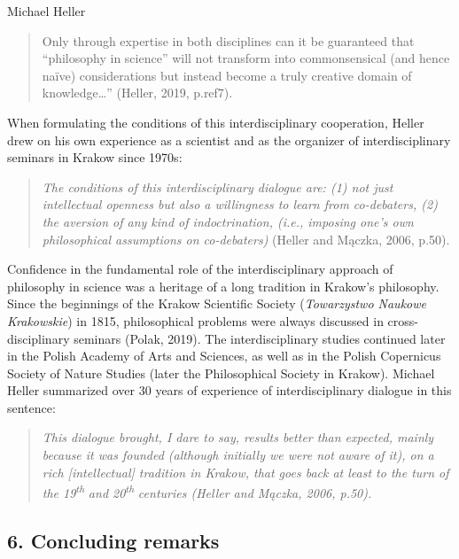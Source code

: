 \begin{artengenv}{Michael Heller}
\begin{quotation}
Only through expertise in both disciplines can it be guaranteed that “philosophy in science” will not transform into
commonsensical (and hence naïve) considerations but instead become a truly creative domain of knowledge…” (Heller,
2019, p.ref7).

\end{quotation}
When formulating the conditions of this interdisciplinary cooperation, Heller drew on his own experience as a scientist
and as the organizer of interdisciplinary seminars in Krakow since 1970s:

\begin{quotation}
\textit{The conditions of this interdisciplinary dialogue are: (1) not just intellectual openness but also a willingness
to learn from co-debaters, (2) the aversion of any kind of indoctrination, (i.e., imposing one’s own philosophical
assumptions on co-debaters)} (Heller and Mączka, 2006, p.50).

\end{quotation}
Confidence in the fundamental role of the interdisciplinary approach of philosophy in science was a heritage of a long
tradition in Krakow’s philosophy. Since the beginnings of the Krakow Scientific Society (\textit{Towarzystwo Naukowe
Krakowskie}) in 1815, philosophical problems were always discussed in cross-disciplinary seminars (Polak, 2019). The
interdisciplinary studies continued later in the Polish Academy of Arts and Sciences, as well as in the Polish
Copernicus Society of Nature Studies (later the Philosophical Society in Krakow). Michael Heller summarized over 30
years of experience of interdisciplinary dialogue in this sentence:

\begin{quotation}
\textit{This dialogue brought, I dare to say, results better than expected, mainly because it was founded (although
initially we were not aware of it), on a rich [intellectual] tradition in Krakow, that goes back at least to the turn
of the 19}\textit{\textsuperscript{th}}\textit{ and 20}\textit{\textsuperscript{th}}\textit{ centuries (Heller and
Mączka, 2006, p.50).}

\end{quotation}

\subsection{6. Concluding remarks}


\end{artengenv}
